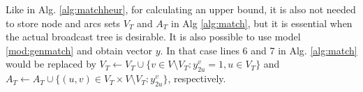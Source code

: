 Like in Alg. \ref{alg:matchheur}, for calculating an upper bound, it is also not needed to store node and arcs sets $V_T$ and $A_T$ in Alg \ref{alg:match},
but it is essential when the actual broadcast tree is desirable.
It is also possible to use model \eqref{mod:genmatch} and obtain vector $y$.
In that case lines 6 and 7 in Alg. \ref{alg:match} would be replaced by $V_T\leftarrow V_T\cup\{v\in V\setminus V_T:y_{2u}^v=1,u\in V_T\}$ and 
$A_T\leftarrow A_T\cup \{(u,v)\in V_T\times V\setminus V_T:y_{2u}^v\}$, respectively.
